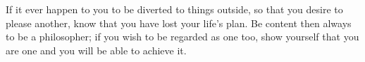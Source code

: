 If it ever happen  to you to be diverted to things outside,  so that you desire
to please another,  know that you have  lost your life's plan.  Be content then
always  to be  a philosopher;  if you  wish  to be  regarded as  one too,  show
yourself that you are one and you will be able to achieve it.
